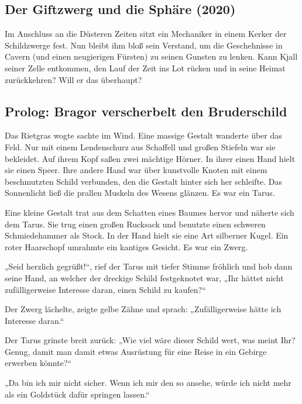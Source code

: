 \begin{chapterbox}
    \chapter{Der Giftzwerg und die Sphäre (2020)}
    \label{Der Giftzwerg und die Sphäre (2020)}
    
    Im Anschluss an die Düsteren Zeiten sitzt ein Mechaniker in einem Kerker der Schildzwerge fest. Nun bleibt ihm bloß sein Verstand, um die Geschehnisse in Cavern (und einen neugierigen Fürsten) zu seinen Gunsten zu lenken. Kann Kjall seiner Zelle entkommen, den Lauf der Zeit ins Lot rücken und in seine Heimat zurückkehren? Will er das überhaupt?
\end{chapterbox}


\section{Prolog: Bragor verscherbelt den Bruderschild}


Das Rietgras wogte sachte im Wind. Eine massige Gestalt wanderte über das Feld. Nur mit einem Lendenschurz aus Schaffell und großen Stiefeln war sie bekleidet. Auf ihrem Kopf saßen zwei mächtige Hörner. In ihrer einen Hand hielt sie einen Speer. Ihre andere Hand war über kunstvolle Knoten mit einem beschmutzten Schild verbunden, den die Gestalt hinter sich her schleifte. Das Sonnenlicht ließ die prallen Muskeln des Wesens glänzen. Es war ein Tarus.

Eine kleine Gestalt trat aus dem Schatten eines Baumes hervor und näherte sich dem Tarus. Sie trug einen großen Rucksack und benutzte einen schweren Schmiedehammer als Stock. In der Hand hielt sie eine Art silberner Kugel. Ein roter Haarschopf umrahmte ein kantiges Gesicht. Es war ein Zwerg.

„Seid herzlich gegrüßt!“, rief der Tarus mit tiefer Stimme fröhlich und hob dann seine Hand, an welcher der dreckige Schild festgeknotet war, „Ihr hättet nicht zufälligerweise Interesse daran, einen Schild zu kaufen?“

Der Zwerg lächelte, zeigte gelbe Zähne und sprach: „Zufälligerweise hätte ich Interesse daran.“

Der Tarus grinste breit zurück: „Wie viel wäre dieser Schild wert, was meint Ihr? Genug, damit man damit etwas Ausrüstung für eine Reise in ein Gebirge erwerben könnte?“

„Da bin ich mir nicht sicher. Wenn ich mir den so ansehe, würde ich nicht mehr als ein Goldstück dafür springen lassen.“

